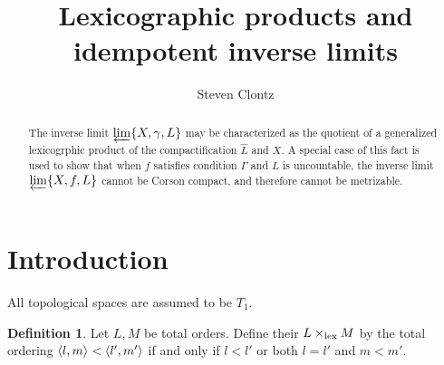\documentclass{amsart}
\theoremstyle{plain}
\theoremstyle{definition}
\newtheorem{definition}[theorem]{Definition}
\theoremstyle{remark}
\theoremstyle{plain}
\theoremstyle{definition}
\theoremstyle{remark}
\begin{document}
\title{Lexicographic products and idempotent inverse limits}




\author{Steven Clontz}
\address{Department of Mathematics and Statistics, The University of South Alabama}







\begin{abstract}
  The inverse limit \(\varprojlim\{X,\gamma,L\}\) may
  be characterized as the quotient of a generalized lexicogrphic product of
  the compactification \(\hat L\) and \(X\). A special case of
  this fact is used to show that when \(f\) satisfies condition \(\Gamma\)
  and \(L\) is uncountable,
  the inverse limit \(\varprojlim\{X,f,L\}\) cannot be Corson compact,
  and therefore cannot be metrizable.
\end{abstract}


\maketitle






\section{Introduction}

All topological spaces are assumed to be \(T_1\).

\begin{definition}
  Let \(L, M\) be total orders. Define their 
  \(L\times_{\operatorname{lex}} M\) by the total ordering \(\langle l,m\rangle<\langle l',m'\rangle\) if and
  only if \(l<l'\) or both \(l=l'\) and \(m<m'\).
\end{definition}
\end{document}
